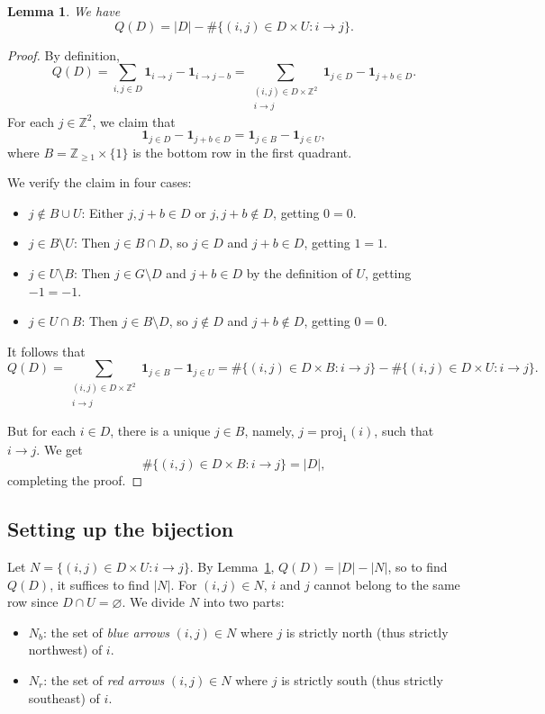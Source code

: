 \documentclass[11pt,reqno]{amsart}
\newtheorem{lemma}[theorem]{Lemma}
\theoremstyle{remark}
\begin{document}
\begin{lemma}\label{lem:deficit}
We have 
    \[ Q(D)=|D|-\#\{(i,j)\in D\times U: i\to j\}.\]
\end{lemma}
\begin{proof}
By definition,
\[
Q(D)=\sum_{i,j\in D} \mathbf{1}_{i\to j}-\mathbf{1}_{i\to j-b}=\sum_{\substack{(i,j)\in D\times \mathbb{Z}^2\\i\to j}} \mathbf{1}_{j\in D}-\mathbf{1}_{j+b\in D}.
\]
For each $j\in \mathbb{Z}^2$, we claim that 
\begin{equation}\label{eq:reduction to boundary}
    \mathbf{1}_{j\in D}-\mathbf{1}_{j+b\in D}=\mathbf{1}_{j\in B}-\mathbf{1}_{j\in U},
\end{equation}
where $B=\mathbb{Z}_{\geq 1}\times \{1\}$ is the bottom row in the first quadrant.

We verify the claim in four cases:
\begin{itemize}
    \item $j\notin B\cup U$: Either $j,j+b\in D$ or $j,j+b\notin D$, getting $0=0$.
    \item $j\in B\setminus U$: Then $j\in B\cap D$, so $j\in D$ and $j+b\in D$, getting $1=1$.
    \item $j\in U\setminus B$: Then $j\in G\setminus D$ and $j+b\in D$ by the definition of $U$, getting $-1=-1$.
    \item $j\in U\cap B$: Then $j\in B\setminus D$, so $j\notin D$ and $j+b\notin D$, getting $0=0$.
\end{itemize}

It follows that
\[ Q(D)=\sum_{\substack{(i,j)\in D\times \mathbb{Z}^2\\i\to j}} \mathbf{1}_{j\in B}-\mathbf{1}_{j\in U} = \#\{(i,j)\in D\times B: i\to j\} - \#\{(i,j)\in D\times U: i\to j\}. \]

But for each $i\in D$, there is a unique $j\in B$, namely, $j=\mathrm{proj}_1(i)$, such that $i\to j$. We get
\[ \#\{(i,j)\in D\times B: i\to j\} = |D|,\]
completing the proof.
\end{proof}

\subsection{Setting up the bijection}
Let $N = \{(i,j)\in D\times U: i\to j\}$. By Lemma~\ref{lem:deficit}, $Q(D)=|D|-|N|$, so to find $Q(D)$, it suffices to find $|N|$. For $(i,j)\in N$, $i$ and $j$ cannot belong to the same row since $D\cap U=\varnothing$. We divide $N$ into two parts:
\begin{itemize}
    \item $N_b$: the set of \emph{blue arrows} $(i,j)\in N$ where $j$ is strictly north (thus strictly northwest) of $i$. 
    \item $N_r$: the set of \emph{red arrows} $(i,j)\in N$ where $j$ is strictly south (thus strictly southeast) of $i$. 
\end{itemize}
\end{document}
